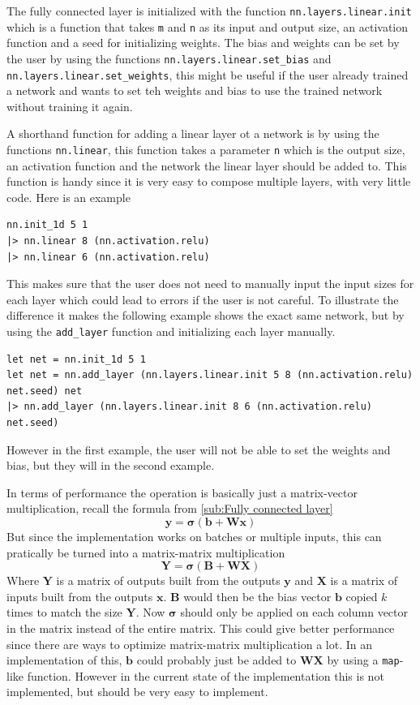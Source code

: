 The fully connected layer is initialized with the function \texttt{nn.layers.linear.init} which is a function that takes \texttt{m} and \texttt{n} as its input and output size, an activation function and a seed for initializing weights.
The bias and weights can be set by the user by using the functions \texttt{nn.layers.linear.set\_bias} and \texttt{nn.layers.linear.set\_weights}, this might be useful if the user already trained a network and wants to set teh weights and bias to use the trained network without training it again.

A shorthand function for adding a linear layer ot a network is by using the functions \texttt{nn.linear}, this function takes a parameter \texttt{n} which is the output size, an activation function and the network the linear layer should be added to. This function is handy since it is very easy to compose multiple layers, with very little code. Here is an example

\begin{lstlisting}
nn.init_1d 5 1
|> nn.linear 8 (nn.activation.relu)
|> nn.linear 6 (nn.activation.relu)
\end{lstlisting}

This makes sure that the user does not need to manually input the input sizes for each layer which could lead to errors if the user is not careful.
To illustrate the difference it makes the following example shows the exact same network, but by using the \texttt{add\_layer} function and initializing each layer manually.

\begin{lstlisting}
let net = nn.init_1d 5 1
let net = nn.add_layer (nn.layers.linear.init 5 8 (nn.activation.relu) net.seed) net
|> nn.add_layer (nn.layers.linear.init 8 6 (nn.activation.relu) net.seed)
\end{lstlisting}

However in the first example, the user will not be able to set the weights and bias, but they will in the second example.

In terms of performance the operation is basically just a matrix-vector multiplication, recall the formula from \autoref{sub:Fully connected layer}
$$\bm{y} = \bm{\sigma} \left( \bm{b} + \bm{W} \bm{x} \right)$$
But since the implementation works on batches or multiple inputs, this can pratically be turned into a matrix-matrix multiplication
$$\bm{Y} = \bm{\sigma} \left( \bm{B} + \bm{W} \bm{X} \right)$$
Where $\bm{Y}$ is a matrix of outputs built from the outputs $\bm{y}$ and $\bm{X}$ is a matrix of inputs built from the outputs $\bm{x}$. $\bm{B}$ would then be the bias vector $\bm{b}$ copied $k$ times to match the size $\bm{Y}$.
Now $\bm{\sigma}$ should only be applied on each column vector in the matrix instead of the entire matrix.
This could give better performance since there are ways to optimize matrix-matrix multiplication a lot.
In an implementation of this, $\bm{b}$ could probably just be added to $\bm{WX}$ by using a \texttt{map}-like function.
However in the current state of the implementation this is not implemented, but should be very easy to implement.

